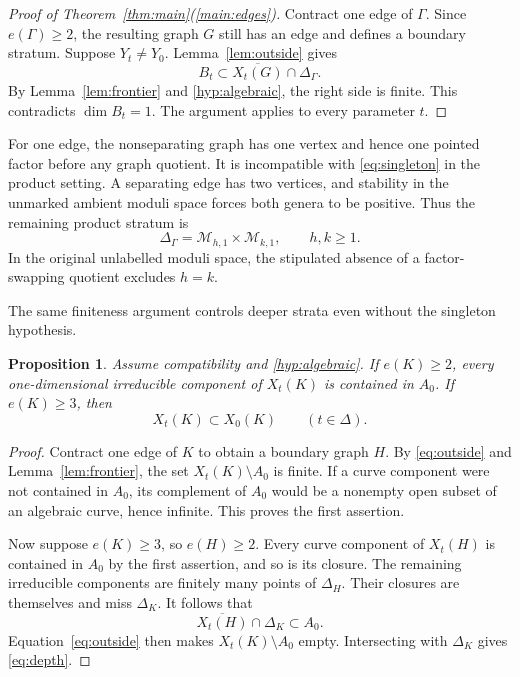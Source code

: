 \documentclass[11pt]{article}
\newcommand{\M}{\mathcal M}
\newcommand{\cl}[1]{\overline{#1}}
\newtheorem{proposition}[theorem]{Proposition}
\theoremstyle{definition}
\theoremstyle{remark}
\begin{document}
\begin{proof}[Proof of Theorem~\ref{thm:main}(\ref{main:edges})]
Contract one edge of $\Gamma$. Since $e(\Gamma)\geq2$, the resulting graph $G$ still has an edge and defines a boundary stratum. Suppose $Y_t\ne Y_0$. Lemma~\ref{lem:outside} gives
\[
 B_t\subset\cl{X_t(G)}\cap\Delta_\Gamma.
\]
By Lemma~\ref{lem:frontier} and \eqref{hyp:algebraic}, the right side is finite. This contradicts $\dim B_t=1$. The argument applies to every parameter $t$.
\end{proof}

For one edge, the nonseparating graph has one vertex and hence one pointed factor before any graph quotient. It is incompatible with \eqref{eq:singleton} in the product setting. A separating edge has two vertices, and stability in the unmarked ambient moduli space forces both genera to be positive. Thus the remaining product stratum is
\begin{equation}\label{eq:separating}
 \Delta_\Gamma=\M_{h,1}\times\M_{k,1},\qquad h,k\geq1.
\end{equation}
In the original unlabelled moduli space, the stipulated absence of a factor-swapping quotient excludes $h=k$.

The same finiteness argument controls deeper strata even without the singleton hypothesis.

\begin{proposition}\label{prop:depth}
Assume compatibility and \eqref{hyp:algebraic}. If $e(K)\geq2$, every one-dimensional irreducible component of $X_t(K)$ is contained in $A_0$. If $e(K)\geq3$, then
\begin{equation}\label{eq:depth}
 X_t(K)\subset X_0(K)\qquad(t\in\Delta).
\end{equation}
\end{proposition}

\begin{proof}
Contract one edge of $K$ to obtain a boundary graph $H$. By \eqref{eq:outside} and Lemma~\ref{lem:frontier}, the set $X_t(K)\setminus A_0$ is finite. If a curve component were not contained in $A_0$, its complement of $A_0$ would be a nonempty open subset of an algebraic curve, hence infinite. This proves the first assertion.

Now suppose $e(K)\geq3$, so $e(H)\geq2$. Every curve component of $X_t(H)$ is contained in $A_0$ by the first assertion, and so is its closure. The remaining irreducible components are finitely many points of $\Delta_H$. Their closures are themselves and miss $\Delta_K$. It follows that
\[
 \cl{X_t(H)}\cap\Delta_K\subset A_0.
\]
Equation~\eqref{eq:outside} then makes $X_t(K)\setminus A_0$ empty. Intersecting with $\Delta_K$ gives \eqref{eq:depth}.
\end{proof}
\end{document}
